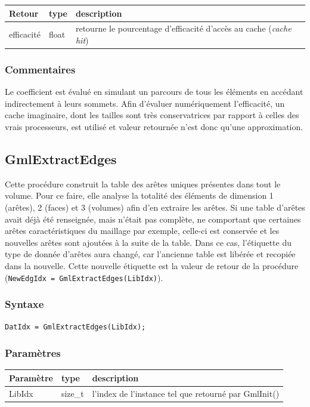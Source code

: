 \documentclass[a4paper,12pt]{article}
\begin{document}
\begin{tabular}{|m{2cm}|m{1.5cm}|m{10.5cm}|}
\hline
Retour     & type   & description \\
\hline
efficacité & float  & retourne le pourcentage d'efficacité d'accès au cache (\emph{cache hit})\\
\hline
\end{tabular}

\subsubsection*{Commentaires}
Le coefficient est évalué en simulant un parcours de tous les éléments en accédant indirectement à leurs sommets.
Afin d'évaluer numériquement l'efficacité, un cache imaginaire, dont les tailles sont très conservatrices par rapport à celles des vrais processeurs, est utilisé et valeur retournée n'est donc qu'une approximation.


\subsection{GmlExtractEdges}
Cette procédure construit la table des arêtes uniques présentes dans tout le volume.
Pour ce faire, elle analyse la totalité des éléments de dimension 1 (arêtes), 2 (faces) et 3 (volumes) afin d'en extraire les arêtes.
Si une table d'arêtes avait déjà été renseignée, mais n'était pas complète, ne comportant que certaines arêtes caractéristiques du maillage par exemple, celle-ci est conservée et les nouvelles arêtes sont ajoutées à la suite de la table. Dans ce cas, l'étiquette du type de donnée d'arêtes aura changé, car l'ancienne table est libérée et recopiée dans la nouvelle. Cette nouvelle étiquette est la valeur de retour de la procédure ({\tt NewEdgIdx = GmlExtractEdges(LibIdx)}).

\subsubsection*{Syntaxe}

{\tt DatIdx = GmlExtractEdges(LibIdx);}

\subsubsection*{Paramètres}

\begin{tabular}{|m{2cm}|m{1.5cm}|m{10.5cm}|}
\hline
Paramètre  & type    & description \\
\hline
LibIdx     & size\_t & l'index de l'instance tel que retourné par GmlInit() \\
\hline
\end{tabular}
\end{document}
